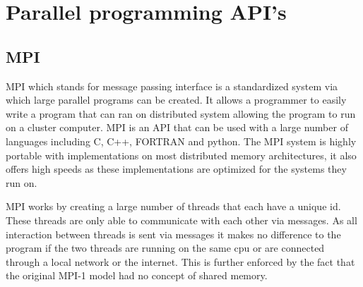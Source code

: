 \section{Parallel programming API's}

\subsection{MPI}
MPI which stands for message passing interface is a standardized system via which large parallel programs can be created. It allows a programmer to easily write a program that can ran on distributed system allowing the program to run on a cluster computer. MPI is an API that can be used with a large number of languages including C, C++, FORTRAN and python. The MPI system is highly portable with implementations on most distributed memory architectures, it also offers high speeds as these implementations are optimized for the systems they run on.

MPI works by creating a large number of threads that each have a unique id. These threads are only able to communicate with each other via messages. As all interaction between threads is sent via messages it makes no difference to the program if the two threads are running on the same cpu or are connected through a local network or the internet. This is further enforced by the fact that the original MPI-1 model had no concept of shared memory.